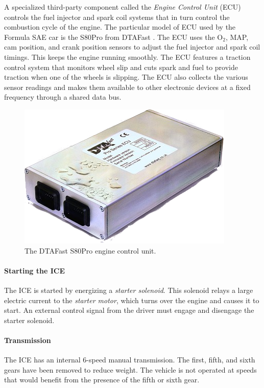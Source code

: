 A specialized third-party component called the \emph{Engine Control Unit} (ECU) controls the fuel injector and spark coil systems that in turn control the combustion cycle of the engine. The particular model of ECU used by the Formula SAE car is the S80Pro from DTAFast \cite{s60pro}. The ECU uses the O$_{2}$, MAP, cam position, and crank position sensors to adjust the fuel injector and spark coil timings. This keeps the engine running smoothly. The ECU features a traction control system that monitors wheel slip and cuts spark and fuel to provide traction when one of the wheels is slipping. The ECU also collects the various sensor readings and makes them available to other electronic devices at a fixed frequency through a shared data bus. 

\begin{figure}[H]
	\centering
	 	\includegraphics[scale=0.5]{figures/s80.png}
    \caption{The DTAFast S80Pro engine control unit.}
    \label{fig:s80pro_product}
\end{figure}

\paragraph{Starting the ICE}

The ICE is started by energizing a \emph{starter solenoid}. This solenoid relays a large electric current to the \emph{starter motor}, which turns over the engine and causes it to start. An external control signal from the driver must engage and disengage the starter solenoid.

\paragraph{Transmission}

The ICE has an internal 6-speed manual transmission. The first, fifth, and sixth gears have been removed to reduce weight. The vehicle is not operated at speeds that would benefit from the presence of the fifth or sixth gear.

